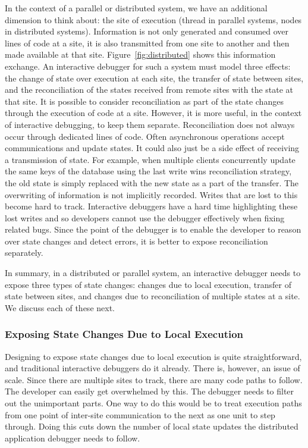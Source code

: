 In the context of a parallel or distributed system, we have an additional dimension to think about: the site of execution (thread in parallel systems, nodes in distributed systems). Information is not only generated and consumed over lines of code at a site, it is also transmitted from one site to another and then made available at that site. Figure~\ref{fig:distributed} shows this information exchange. An interactive debugger for such a system must model three effects: the change of state over execution at each site, the transfer of state between sites, and the reconciliation of the states received from remote sites with the state at that site. It is possible to consider reconciliation as part of the state changes through the execution of code at a site. However, it is more useful, in the context of interactive debugging, to keep them separate. Reconciliation does not always occur through dedicated lines of code. Often asynchronous operations accept communications and update states. It could also just be a side effect of receiving a transmission of state. For example, when multiple clients concurrently update the same keys of the database using the last write wins reconciliation strategy, the old state is simply replaced with the new state as a part of the transfer. The overwriting of information is not implicitly recorded. Writes that are lost to this become hard to track. Interactive debuggers have a hard time highlighting these lost writes and so developers cannot use the debugger effectively when fixing related bugs. Since the point of the debugger is to enable the developer to reason over state changes and detect errors, it is better to expose reconciliation separately. 

In summary, in a distributed or parallel system, an interactive debugger needs to expose three types of state changes: changes due to local execution, transfer of state between sites, and changes due to reconciliation of multiple states at a site. We discuss each of these next.

\subsubsection{Exposing State Changes Due to Local Execution}
\label{subsubsec:local_exec}
Designing to expose state changes due to local execution is quite straightforward, and traditional interactive debuggers do it already. There is, however, an issue of scale. Since there are multiple sites to track, there are many code paths to follow. The developer can easily get overwhelmed by this. The debugger needs to filter out the unimportant parts. One way to do this would be to treat execution paths from one point of inter-site communication to the next as one unit to step through. Doing this cuts down the number of local state updates the distributed application debugger needs to follow.

